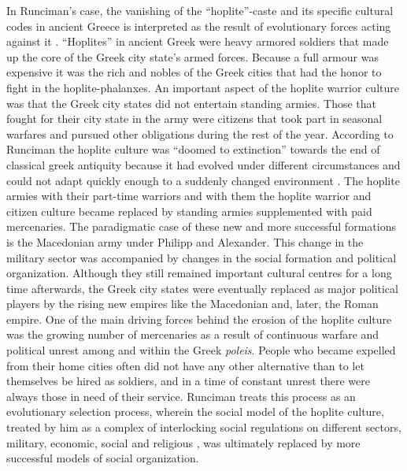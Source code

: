 In Runciman's case, the vanishing of the ``hoplite''-caste and its
specific cultural codes in ancient Greece is interpreted as the result
of evolutionary forces acting against it \cite[]{runciman:1990}.
``Hoplites'' in ancient Greek were heavy armored soldiers that made up
the core of the Greek city state's armed forces. Because a full armour
was expensive it was the rich and nobles of the Greek cities that had
the honor to fight in the hoplite-phalanxes. An important aspect of
the hoplite warrior culture was that the Greek city states did not
entertain standing armies. Those that fought for their city state in
the army were citizens that took part in seasonal warfares and pursued
other obligations during the rest of the year. According to Runciman
the hoplite culture was ``doomed to extinction'' towards the end of
classical greek antiquity because it had evolved under different
circumstances and could not adapt quickly enough to a suddenly changed
environment \cite[p.\  355f.]{runciman:1990}. The hoplite armies with
their part-time warriors and with them the hoplite warrior and citizen
culture became replaced by standing armies supplemented with paid
mercenaries.  The paradigmatic case of these new and more successful
formations is the Macedonian army under Philipp and Alexander. This
change in the military sector was accompanied by changes in the social
formation and political organization. Although they still remained
important cultural centres for a long time afterwards, the Greek city
states were eventually replaced as major political players by the
rising new empires like the Macedonian and, later, the Roman
empire. One of the main driving forces behind the erosion of the
hoplite culture was the growing number of mercenaries as a result of
continuous warfare and political unrest among and within the Greek
{\em poleis}.  People who became expelled from their home cities often did
not have any other alternative than to let themselves be hired as
soldiers, and in a time of constant unrest there were always those in
need of their service. Runciman treats this process as an evolutionary
selection process, wherein the social model of the hoplite culture,
treated by him as a complex of interlocking social regulations on
different sectors, military, economic, social and religious
\cite[p.\ 351ff.]{runciman:1990}, was ultimately replaced by more
successful models of social organization.

